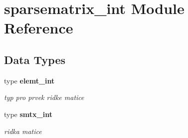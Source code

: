 \section{sparsematrix\+\_\+int Module Reference}
\label{namespacesparsematrix__int}
\subsection*{Data Types}
\begin{DoxyCompactItemize}
\item 
type {\bf elemt\+\_\+int}
\begin{DoxyCompactList}\small\item\em typ pro prvek ridke matice \end{DoxyCompactList}\item 
type {\bf smtx\+\_\+int}
\begin{DoxyCompactList}\small\item\em ridka matice \end{DoxyCompactList}\end{DoxyCompactItemize}
